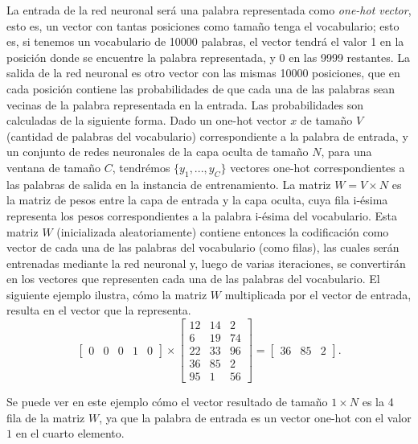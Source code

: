 \bigskip La entrada de la red neuronal será una palabra representada como \textit{one-hot vector}, esto es, un vector con tantas posiciones como tamaño tenga el vocabulario; esto es, si tenemos un vocabulario de 10000 palabras, el vector tendrá el valor 1 en la posición donde se encuentre la palabra representada, y 0 en las 9999 restantes. La salida de la red neuronal es otro vector con las mismas 10000 posiciones, que en cada posición contiene las probabilidades de que cada una de las palabras sean vecinas de la palabra representada en la entrada. Las probabilidades son calculadas de la siguiente forma. Dado un one-hot vector \(x\) de tamaño \(V\) (cantidad de palabras del vocabulario) correspondiente a la palabra de entrada, y un conjunto de redes neuronales de la capa oculta de tamaño \(N\), para una ventana de tamaño \(C\), tendrémos \(\{y_1,...,y_C\}\) vectores one-hot correspondientes a las palabras de salida en la instancia de entrenamiento. La matriz \(W=V \times N\) es la matriz de pesos entre la capa de entrada y la capa oculta, cuya fila i-ésima representa los pesos correspondientes a la palabra i-ésima del vocabulario. Esta matriz \(W\)  (inicializada aleatoriamente) contiene entonces la codificación como vector de cada una de las palabras del vocabulario (como filas), las cuales serán entrenadas mediante la red neuronal y, luego de varias iteraciones, se convertirán en los vectores que representen cada una de las palabras del vocabulario. El siguiente ejemplo ilustra, cómo la matriz \(W\) multiplicada por el vector de entrada, resulta en el vector que la representa.
\[\begin{bmatrix}0 & 0 & 0 & 1 & 0 \end{bmatrix} \times  \begin{bmatrix}12 & 14 & 2 \\ 6 & 19 & 74 \\ 22 & 33 & 96 \\ 36 & 85 & 2 \\ 95 & 1 & 56 \end{bmatrix} = \begin{bmatrix} 36 & 85 & 2 \end{bmatrix}.\]

Se puede ver en este ejemplo cómo el vector resultado de tamaño \(1 \times N\) es la 4 fila de la matriz \(W\), ya que la palabra de entrada es un vector one-hot con el valor \(1\) en el cuarto elemento.

